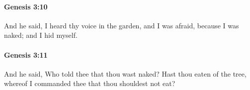 		\paragraph{Genesis 3:10} %
			\label{GENESIS-3-10}

			And he said, I heard thy voice in the garden, and I was afraid, because I was naked; and I hid myself.


		\paragraph{Genesis 3:11} %
			\label{GENESIS-3-11}

			And he said, Who told thee that thou wast naked? Hast thou eaten of the tree, whereof I commanded thee that thou shouldest not eat?


